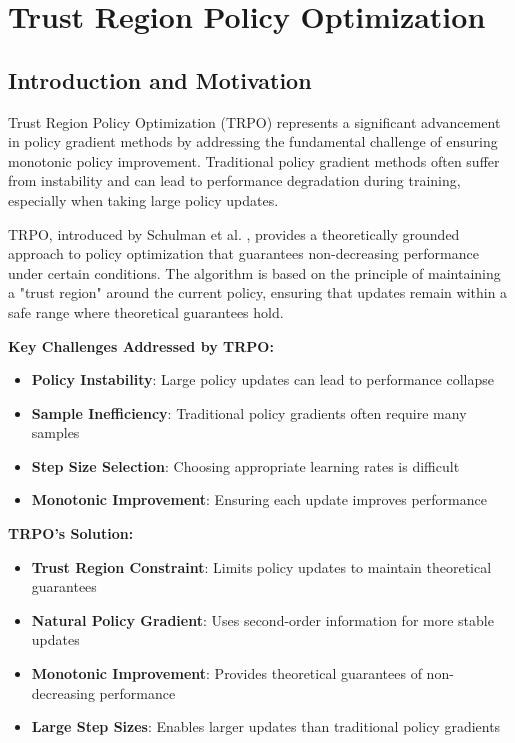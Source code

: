 \section{Trust Region Policy Optimization}

\subsection{Introduction and Motivation}

Trust Region Policy Optimization (TRPO) represents a significant advancement in policy gradient methods by addressing the fundamental challenge of ensuring monotonic policy improvement. Traditional policy gradient methods often suffer from instability and can lead to performance degradation during training, especially when taking large policy updates.

TRPO, introduced by Schulman et al. \cite{schulman2015trust}, provides a theoretically grounded approach to policy optimization that guarantees non-decreasing performance under certain conditions. The algorithm is based on the principle of maintaining a "trust region" around the current policy, ensuring that updates remain within a safe range where theoretical guarantees hold.

\textbf{Key Challenges Addressed by TRPO:}
\begin{itemize}
    \item \textbf{Policy Instability}: Large policy updates can lead to performance collapse
    \item \textbf{Sample Inefficiency}: Traditional policy gradients often require many samples
    \item \textbf{Step Size Selection}: Choosing appropriate learning rates is difficult
    \item \textbf{Monotonic Improvement}: Ensuring each update improves performance
\end{itemize}

\textbf{TRPO's Solution:}
\begin{itemize}
    \item \textbf{Trust Region Constraint}: Limits policy updates to maintain theoretical guarantees
    \item \textbf{Natural Policy Gradient}: Uses second-order information for more stable updates
    \item \textbf{Monotonic Improvement}: Provides theoretical guarantees of non-decreasing performance
    \item \textbf{Large Step Sizes}: Enables larger updates than traditional policy gradients
\end{itemize} 

